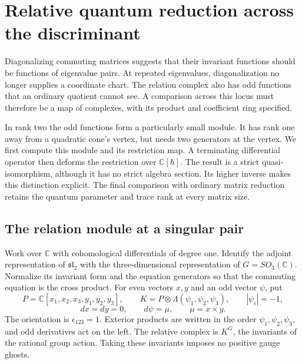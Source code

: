 \chapter{Relative quantum reduction across the discriminant}
\label{chap:vol2-relative-quantum-reduction}

Diagonalizing commuting matrices suggests that their invariant functions
should be functions of eigenvalue pairs. At repeated eigenvalues,
diagonalization no longer supplies a coordinate chart. The relation complex
also has odd functions that an ordinary quotient cannot see. A comparison
across this locus must therefore be a map of complexes, with its product
and coefficient ring specified.

In rank two the odd functions form a particularly small module. It has
rank one away from a quadratic cone's vertex, but needs two generators at
the vertex. We first compute this module and its restriction map.
A terminating differential operator then deforms the restriction over
$\mathbb C[\hbar]$. The result is a strict quasi-isomorphism, although it
has no strict algebra section. Its higher inverse makes this distinction
explicit. The final comparison with ordinary matrix reduction retains
the quantum parameter and trace rank at every matrix size.

\section{The relation module at a singular pair}
\label{sec:vol2-rank-two-koszul}

Work over $\mathbb C$ with cohomological differentials of degree one.
Identify the adjoint representation of $\mathfrak{sl}_2$ with the
three-dimensional representation of $G=SO_3(\mathbb C)$.
Normalize its invariant form and the equation generators so that the
commuting equation is the cross product. For even vectors $x,y$ and an
odd vector $\psi$, put
\[
 P=\mathbb C[x_1,x_2,x_3,y_1,y_2,y_3],
 \qquad
 K=P\otimes\Lambda(\psi_1,\psi_2,\psi_3),
 \qquad |\psi_i|=-1,
\]
\begin{equation}\label{eq:vol2-rank-two-koszul}
 dx=dy=0,\qquad d\psi=\mu,\qquad \mu=x\times y.
\end{equation}
The orientation is $\epsilon_{123}=1$. Exterior products are written
in the order $\psi_1,\psi_2,\psi_3$, and odd derivatives act on the left.
The relative complex is $K^G$, the invariants of the rational group
action. Taking these invariants imposes no positive gauge ghosts.

